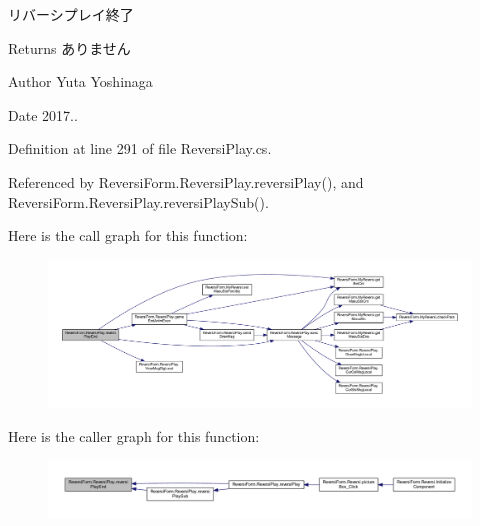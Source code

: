 リバーシプレイ終了 

\begin{DoxyReturn}{Returns}
ありません 
\end{DoxyReturn}
\begin{DoxyAuthor}{Author}
Yuta Yoshinaga 
\end{DoxyAuthor}
\begin{DoxyDate}{Date}
2017.. 
\end{DoxyDate}


Definition at line 291 of file Reversi\+Play.\+cs.



Referenced by Reversi\+Form.\+Reversi\+Play.\+reversi\+Play(), and Reversi\+Form.\+Reversi\+Play.\+reversi\+Play\+Sub().

Here is the call graph for this function\+:
\nopagebreak
\begin{figure}[H]
\begin{center}
\leavevmode
\includegraphics[width=350pt]{class_reversi_form_1_1_reversi_play_abb6d68c910c7d14ff4eaa8db745f0449_cgraph}
\end{center}
\end{figure}
Here is the caller graph for this function\+:
\nopagebreak
\begin{figure}[H]
\begin{center}
\leavevmode
\includegraphics[width=350pt]{class_reversi_form_1_1_reversi_play_abb6d68c910c7d14ff4eaa8db745f0449_icgraph}
\end{center}
\end{figure}
\mbox{\label{class_reversi_form_1_1_reversi_play_adcbe040514044b7cc8498c0764638356}} 
